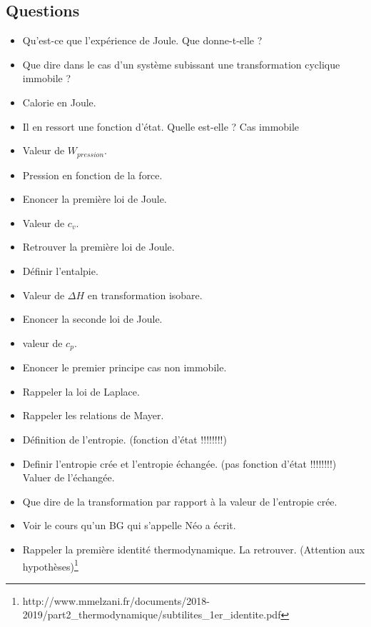 \documentclass[a4paper, 11pt, hidelinks]{article}
\begin{document}
\subsection{Questions}

\begin{itemize}
    \item Qu'est-ce que l'expérience de Joule. Que donne-t-elle ? \cite{Chapitre19}
    \item Que dire dans le cas d'un système subissant une transformation cyclique immobile ? \cite{Chapitre19}
    \item Calorie en Joule. \cite{Chapitre19}
    \item Il en ressort une fonction d'état. Quelle est-elle ? Cas immobile \cite{Chapitre19}
    \item Valeur de $W_{pression}$. \cite{Chapitre19}
    \item Pression en fonction de la force. \cite{Chapitre19}
    \item Enoncer la première loi de Joule. \cite{Chapitre19}
    \item Valeur de $c_v$. \cite{Chapitre19}
    \item Retrouver la première loi de Joule. \cite{Chapitre19}
    \item Définir l'entalpie. \cite{Chapitre19}
    \item Valeur de $\Delta H$ en transformation isobare. \cite{Chapitre19}
    \item Enoncer la seconde loi de Joule. \cite{Chapitre19}
    \item valeur de $c_p$. \cite{Chapitre19}
    \item Enoncer le premier principe cas non immobile. \cite{Chapitre19}
    \item Rappeler la loi de Laplace. \cite{Chapitre19}
    \item Rappeler les relations de Mayer. \cite{Chapitre19}
    \item Définition de l'entropie. (fonction d'état !!!!!!!!) \cite{Chapitre19}
    \item Definir l'entropie crée et l'entropie échangée. (pas fonction d'état !!!!!!!!) Valuer de l'échangée. \cite{Chapitre19}
    \item Que dire de la transformation par rapport à la valeur de l'entropie crée. \cite{Chapitre19}
    \item Voir le cours qu'un BG qui s'appelle Néo a écrit.
    \item Rappeler la première identité thermodynamique. La retrouver. (Attention aux hypothèses)\footnote{http://www.mmelzani.fr/documents/2018-2019/part2\_thermodynamique/subtilites\_1er\_identite.pdf} \cite{Chapitre19}

\end{itemize}
\end{document}
